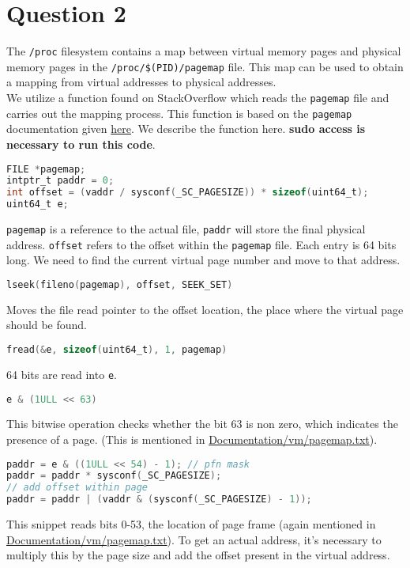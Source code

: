 \documentclass[a4paper,12pt]{article}
\begin{document}
\section{Question 2}
The \texttt{/proc} filesystem contains a map between virtual memory pages and physical memory pages in the \texttt{/proc/\$(PID)/pagemap} file. This map can be used to obtain a mapping from virtual addresses to physical addresses.\\
We utilize a function found on StackOverflow which reads the \texttt{pagemap} file and carries out the mapping process. This function is based on the \texttt{pagemap} documentation given \href{https://www.kernel.org/doc/Documentation/vm/pagemap.txt}{here}. We describe the function here. \textbf{sudo access is necessary to run this code}.
\begin{lstlisting}[language=C]
FILE *pagemap;
intptr_t paddr = 0;
int offset = (vaddr / sysconf(_SC_PAGESIZE)) * sizeof(uint64_t);
uint64_t e;
\end{lstlisting}
\texttt{pagemap} is a reference to the actual file, \texttt{paddr} will store the final physical address. \texttt{offset} refers to the offset within the \texttt{pagemap} file. Each entry is 64 bits long. We need to find the current virtual page number and move to that address.
\begin{lstlisting}[language=C]
lseek(fileno(pagemap), offset, SEEK_SET)
\end{lstlisting}
Moves the file read pointer to the offset location, the place where the virtual page should be found.
\begin{lstlisting}[language=C]
fread(&e, sizeof(uint64_t), 1, pagemap)
\end{lstlisting}
64 bits are read into \texttt{e}.
\begin{lstlisting}[language=C]
e & (1ULL << 63)
\end{lstlisting}
This bitwise operation checks whether the bit 63 is non zero, which indicates the presence of a page. (This is mentioned in \href{https://www.kernel.org/doc/Documentation/vm/pagemap.txt}{Documentation/vm/pagemap.txt}).
\begin{lstlisting}[language=C]
paddr = e & ((1ULL << 54) - 1); // pfn mask
paddr = paddr * sysconf(_SC_PAGESIZE);
// add offset within page
paddr = paddr | (vaddr & (sysconf(_SC_PAGESIZE) - 1));
\end{lstlisting}
This snippet reads bits 0-53, the location of page frame (again mentioned in \href{https://www.kernel.org/doc/Documentation/vm/pagemap.txt}{Documentation/vm/pagemap.txt}). To get an actual address, it's necessary to multiply this by the page size and add the offset present in the virtual address.
\end{document}
